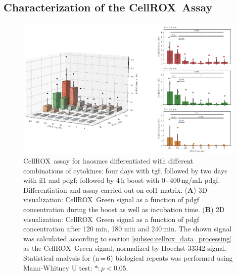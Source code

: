     \subsection{Characterization of the CellROX\texttrademark~Assay}
    \begin{figure}[h!]
    \capstart
        \centering
    	\includegraphics{Abbildung/CellROX_titration_no_norm.pdf}

    	\begin{minipage}{\captionwidth}
    		\caption[cellROX_titration]{ \newline
            CellROX\texttrademark~assay for \acp{haosmc} differentiated with different combinations of cytokines: four days with \ac{tgf}; followed by two days with \ac{il1} and \ac{pdgf}; followed by 4\,h boost with 0\,-\,400\,ng/mL \ac{pdgf}. Differentiation and assay carried out on \ac{col1} matrix.
            (\textbf{A}) 3D visualization: CellROX\texttrademark~Green signal as a function of \ac{pdgf} concentration during the boost as well as incubation time.
            (\textbf{B}) 2D visualization: CellROX\texttrademark~Green signal as a function of \ac{pdgf} concentration after 120 min, 180 min and 240\,min.
            The shown signal was calculated according to section \ref{subsec:cellrox_data_processing} as the CellROX\texttrademark~Green signal, normalized by Hoechst 33342 signal. Statistical analysis for (n\,=\,6) biological repeats was performed using Mann-Whitney U test: $*: p < 0.05$.}
    		\label{fig:cellROX_titration}
    	\end{minipage}
    \end{figure}

